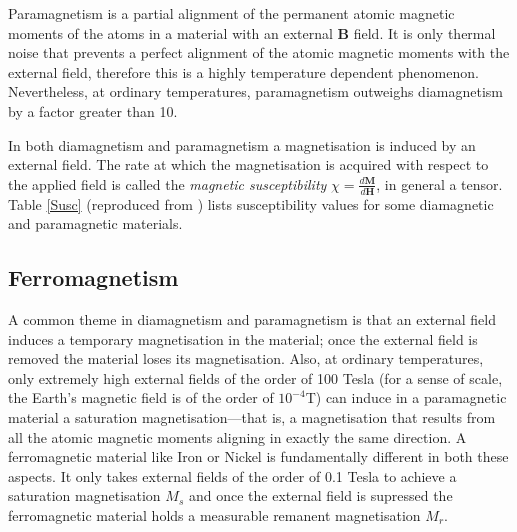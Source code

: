 Paramagnetism is a partial alignment of the permanent atomic magnetic moments of the atoms in a material with an external $\mathbf{B}$ field. It is only thermal noise that prevents a perfect alignment of the atomic magnetic moments with the external field, therefore this is a highly temperature dependent phenomenon. Nevertheless, at ordinary temperatures, paramagnetism outweighs diamagnetism by a factor greater than 10.\par

In both diamagnetism and paramagnetism a magnetisation is induced by an external field. The rate at which the magnetisation is acquired with respect to the applied field is called the \textit{magnetic susceptibility} $\chi = \frac{d\mathbf{M}}{d\mathbf{H}}$, in general a tensor. Table \ref{Susc} (reproduced from \citet{DuOzRM}) lists susceptibility values for some diamagnetic and paramagnetic materials.\par

\subsection{Ferromagnetism}

A common theme in diamagnetism and paramagnetism is that an external field induces a temporary magnetisation in the material; once the external field is removed the material loses its magnetisation. Also, at ordinary temperatures, only extremely high external fields of the order of 100 Tesla (for a sense of scale, the Earth's magnetic field is of the order of $10^{-4}$T) can induce in a paramagnetic material a saturation magnetisation---that is, a magnetisation that results from all the atomic magnetic moments aligning in exactly the same direction. A ferromagnetic material like Iron or Nickel is fundamentally different in both these aspects. It only takes external fields of the order of 0.1 Tesla to achieve a saturation magnetisation $M_s$ and once the external field is supressed the ferromagnetic material holds a measurable remanent magnetisation $M_r$.\par

